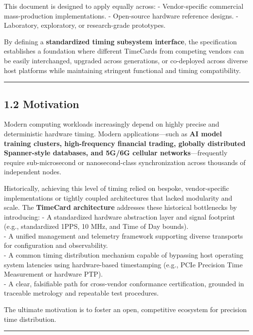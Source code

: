 \documentclass[
]{article}
\begin{document}
This document is designed to apply equally across: - Vendor-specific
commercial mass-production implementations. - Open-source hardware
reference designs. - Laboratory, exploratory, or research-grade
prototypes.

By defining a \textbf{standardized timing subsystem interface}, the
specification establishes a foundation where different TimeCards from
competing vendors can be easily interchanged, upgraded across
generations, or co-deployed across diverse host platforms while
maintaining stringent functional and timing compatibility.

\begin{center}\rule{0.5\linewidth}{0.5pt}\end{center}

\subsection{1.2 Motivation}\label{motivation}

Modern computing workloads increasingly depend on highly precise and
deterministic hardware timing. Modern applications---such as \textbf{AI
model training clusters, high-frequency financial trading, globally
distributed Spanner-style databases, and 5G/6G cellular
networks}---frequently require sub-microsecond or nanosecond-class
synchronization across thousands of independent nodes.

Historically, achieving this level of timing relied on bespoke,
vendor-specific implementations or tightly coupled architectures that
lacked modularity and scale. The \textbf{TimeCard architecture}
addresses these historical bottlenecks by introducing: - A standardized
hardware abstraction layer and signal footprint (e.g., standardized
1PPS, 10 MHz, and Time of Day bounds).\\
- A unified management and telemetry framework supporting diverse
transports for configuration and observability.\\
- A common timing distribution mechanism capable of bypassing host
operating system latencies using hardware-based timestamping (e.g., PCIe
Precision Time Measurement or hardware PTP).\\
- A clear, falsifiable path for cross-vendor conformance certification,
grounded in traceable metrology and repeatable test procedures.

The ultimate motivation is to foster an open, competitive ecosystem for
precision time distribution.

\begin{center}\rule{0.5\linewidth}{0.5pt}\end{center}
\end{document}
